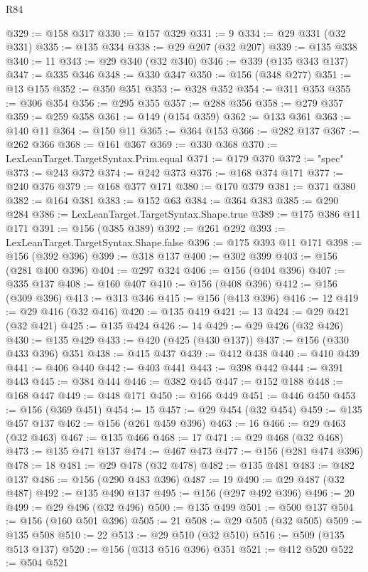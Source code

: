 \begin{lexlean}{R84}
\begin{coremodule}
@329 := @158 @317
@330 := @157 @329
@331 := 9
@334 := @29 @331 (@32 @331)
@335 := @135 @334
@338 := @29 @207 (@32 @207)
@339 := @135 @338
@340 := 11
@343 := @29 @340 (@32 @340)
@346 := @339 (@135 @343 @137)
@347 := @335 @346
@348 := @330 @347
@350 := @156 (@348 @277)
@351 := @13 @155
@352 := @350 @351
@353 := @328 @352
@354 := @311 @353
@355 := @306 @354
@356 := @295 @355
@357 := @288 @356
@358 := @279 @357
@359 := @259 @358
@361 := @149 (@154 @359)
@362 := @133 @361
@363 := @140 @11
@364 := @150 @11
@365 := @364 @153
@366 := @282 @137
@367 := @262 @366
@368 := @161 @367
@369 := @330 @368
@370 := LexLeanTarget.TargetSyntax.Prim.equal
@371 := @179 @370
@372 := "spec"
@373 := @243 @372
@374 := @242 @373
@376 := @168 @374 @171
@377 := @240 @376
@379 := @168 @377 @171
@380 := @170 @379
@381 := @371 @380
@382 := @164 @381
@383 := @152 @63
@384 := @364 @383
@385 := @290 @284
@386 := LexLeanTarget.TargetSyntax.Shape.true
@389 := @175 @386 @11 @171
@391 := @156 (@385 @389)
@392 := @261 @292
@393 := LexLeanTarget.TargetSyntax.Shape.false
@396 := @175 @393 @11 @171
@398 := @156 (@392 @396)
@399 := @318 @137
@400 := @302 @399
@403 := @156 (@281 @400 @396)
@404 := @297 @324
@406 := @156 (@404 @396)
@407 := @335 @137
@408 := @160 @407
@410 := @156 (@408 @396)
@412 := @156 (@309 @396)
@413 := @313 @346
@415 := @156 (@413 @396)
@416 := 12
@419 := @29 @416 (@32 @416)
@420 := @135 @419
@421 := 13
@424 := @29 @421 (@32 @421)
@425 := @135 @424
@426 := 14
@429 := @29 @426 (@32 @426)
@430 := @135 @429
@433 := @420 (@425 (@430 @137))
@437 := @156 (@330 @433 @396) @351
@438 := @415 @437
@439 := @412 @438
@440 := @410 @439
@441 := @406 @440
@442 := @403 @441
@443 := @398 @442
@444 := @391 @443
@445 := @384 @444
@446 := @382 @445
@447 := @152 @188
@448 := @168 @447
@449 := @448 @171
@450 := @166 @449
@451 := @446 @450
@453 := @156 (@369 @451)
@454 := 15
@457 := @29 @454 (@32 @454)
@459 := @135 @457 @137
@462 := @156 (@261 @459 @396)
@463 := 16
@466 := @29 @463 (@32 @463)
@467 := @135 @466
@468 := 17
@471 := @29 @468 (@32 @468)
@473 := @135 @471 @137
@474 := @467 @473
@477 := @156 (@281 @474 @396)
@478 := 18
@481 := @29 @478 (@32 @478)
@482 := @135 @481
@483 := @482 @137
@486 := @156 (@290 @483 @396)
@487 := 19
@490 := @29 @487 (@32 @487)
@492 := @135 @490 @137
@495 := @156 (@297 @492 @396)
@496 := 20
@499 := @29 @496 (@32 @496)
@500 := @135 @499
@501 := @500 @137
@504 := @156 (@160 @501 @396)
@505 := 21
@508 := @29 @505 (@32 @505)
@509 := @135 @508
@510 := 22
@513 := @29 @510 (@32 @510)
@516 := @509 (@135 @513 @137)
@520 := @156 (@313 @516 @396) @351
@521 := @412 @520
@522 := @504 @521

\end{coremodule}
\end{lexlean}
